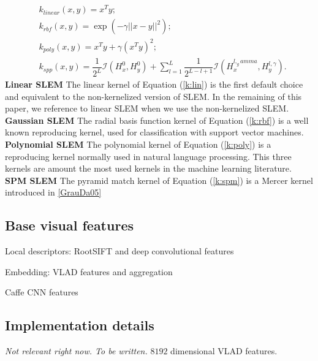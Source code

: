 \begin{align}
    &k_{linear}(x,y) = x^Ty; \label{k:lin}\\
    &k_{rbf}(x,y) = \exp(-\gamma|\! |x-y|\! |^2); \label{k:rbf}\\
    &k_{poly}(x,y) = x^Ty+\gamma(x^Ty)^2; \label{k:poly}\\
    &k_{spp}(x,y) = \dfrac{1}{2^L}\mathcal{I}(H^0_x, H^0_y) +\sum_{l=1}^L\dfrac{1}{2^{L-l+1}}\mathcal{I}(H^{l,_gamma}_x, H^{l,\gamma}_y). \label{k:spm}
\end{align}
\textbf{Linear SLEM} The linear kernel of Equation (\ref{k:lin}) is the first default choice and equivalent to the non-kernelized version of SLEM.
In the remaining of this paper, we reference to linear SLEM when we use the non-kernelized SLEM.
\textbf{Gaussian SLEM} The radial basis function kernel of Equation (\ref{k:rbf}) is a
well known reproducing kernel, used for classification with support vector machines.
\textbf{Polynomial SLEM} The polynomial kernel of Equation (\ref{k:poly}) is a reproducing kernel normally used in natural language processing. 
This three kernels are amount the most used kernels in the machine learning literature.
\textbf{SPM SLEM} The pyramid match kernel of Equation (\ref{k:spm}) is a Mercer kernel introduced in \ref{GrauDa05} 



\subsection{Base visual features}
Local descriptors: RootSIFT \cite{3things} and deep convolutional features \cite{SimonZisser15}

Embedding: VLAD features \cite{VLAD} and aggregation \cite{babenko15}

Caffe CNN features \cite{jia2014caffe}




\subsection{Implementation details}
\emph{\color{red} Not relevant right now.  To be written.}
$8192$ dimensional VLAD features.


